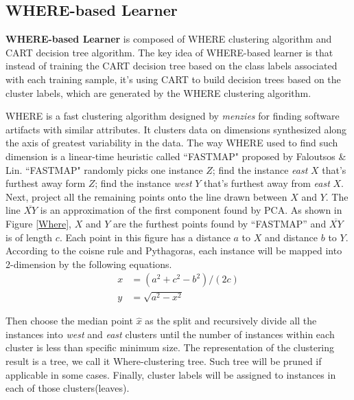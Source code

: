 \documentclass{sig-alternative}
\begin{document}
 \subsection{WHERE-based Learner}
\textbf{WHERE-based Learner} is composed of WHERE clustering algorithm and CART 
decision tree algorithm. The key idea of WHERE-based learner is that  instead of training the 
CART decision tree based on the class labels associated with each training sample, it's using 
CART to build decision trees based on the cluster labels, which are generated by the WHERE 
clustering algorithm.
 
 
WHERE is a fast clustering algorithm designed by {\it menzies} for finding software artifacts 
with similar attributes. It clusters data on dimensions synthesized along the axis of greatest 
variability in the data. The way WHERE used to find such dimension is a linear-time heuristic 
called ``FASTMAP" proposed by Faloutsos \& Lin\cite{faloutsos1995fastmap}. ``FASTMAP" 
randomly picks one instance $Z$; find the instance {\it east} $X$ that's furthest away form $Z$; find 
the instance {\it west} $Y$ that's furthest away from {\it east} $X$. Next, project all the remaining 
points onto the line drawn between $X$ and $Y$.  The line $\overline{XY}$ is an approximation of the 
first component found by PCA. As shown in Figure \ref{Where}, $X$ and $Y$ are the furthest points found by ``FASTMAP'' and $\overline{XY}$ is of length $c$. Each point in this figure has a distance $a$
to $X$ and distance $b$ to $Y$. According to the coisne rule and Pythagoras, each instance will be mapped 
into 2-dimension by the following equations.
\begin{equation}
	\begin{split}
			x  &= (a^2 +c^2-b^2)/(2c)\\ 
		    y  &= \sqrt{a^2 -x^2}
	\end{split}
\end{equation}


Then choose the median point $\hat{x}$ as the split and 
recursively divide all the instances into {\it west} and {\it east} clusters until the number of 
instances within each cluster is less than specific minimum size. The representation of the 
clustering result is a tree, we call it Where-clustering tree. Such tree will be pruned if applicable 
in some cases. Finally, cluster labels  will be assigned to instances in each of those 
clusters(leaves). 
\end{document}
